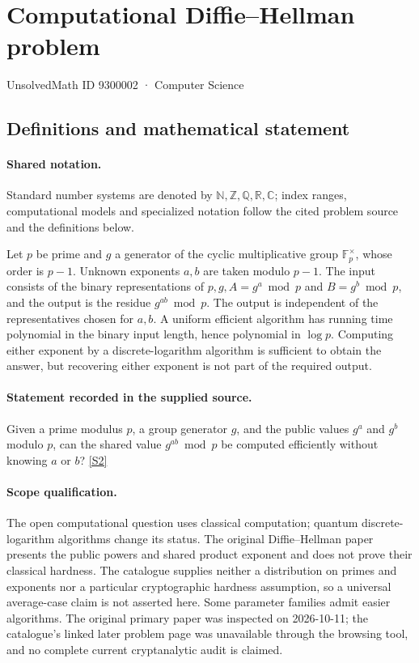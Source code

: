 \documentclass[11pt]{article}
\newcommand{\sref}[2]{\hyperlink{source:#1:#2}{[S#2]}}
\begin{document}
\setcounter{section}{9300001}
\section{Computational Diffie–Hellman problem}\label{9300002}
{\small\sffamily UnsolvedMath ID 9300002 · Computer Science}
\subsection{Definitions and mathematical statement}

\paragraph{Shared notation.}Standard number systems are denoted by $\mathbb N,\mathbb Z,\mathbb Q,\mathbb R,\mathbb C$; index ranges, computational models and specialized notation follow the cited problem source and the definitions below.


Let $p$ be prime and $g$ a generator of the cyclic multiplicative group $\mathbb{F}_p^{\times}$, whose order is $p-1$. Unknown exponents $a,b$ are taken modulo $p-1$. The input consists of the binary representations of $p,g,A=g^a\bmod p$ and $B=g^b\bmod p$, and the output is the residue $g^{ab}\bmod p$. The output is independent of the representatives chosen for $a,b$. A uniform efficient algorithm has running time polynomial in the binary input length, hence polynomial in $\log p$. Computing either exponent by a discrete-logarithm algorithm is sufficient to obtain the answer, but recovering either exponent is not part of the required output.
\paragraph{Statement recorded in the supplied source.}
Given a prime modulus $p$, a group generator $g$, and the public values $g^a$ and $g^b$ modulo $p$, can the shared value $g^{ab}\bmod p$ be computed efficiently without knowing $a$ or $b$? \sref{9300002}{2}
\paragraph{Scope qualification.}
The open computational question uses classical computation; quantum discrete-logarithm algorithms change its status. The original Diffie--Hellman paper presents the public powers and shared product exponent and does not prove their classical hardness. The catalogue supplies neither a distribution on primes and exponents nor a particular cryptographic hardness assumption, so a universal average-case claim is not asserted here. Some parameter families admit easier algorithms. The original primary paper was inspected on 2026-10-11; the catalogue's linked later problem page was unavailable through the browsing tool, and no complete current cryptanalytic audit is claimed.
\end{document}

